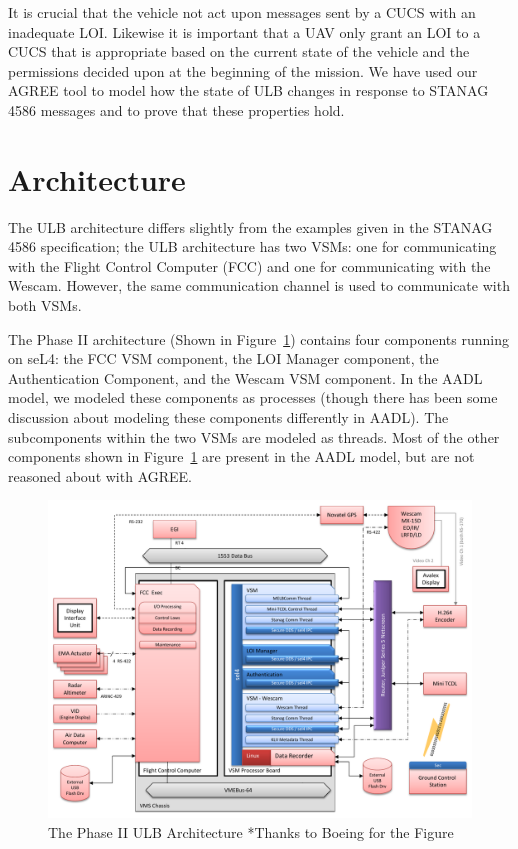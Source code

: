 \documentclass{llncs}
\begin{document}
It is crucial that the vehicle not act upon messages sent by a CUCS with an inadequate LOI.  Likewise it is important that a UAV only grant an LOI to a CUCS that is appropriate based on the current state of the vehicle and the permissions decided upon at the beginning of the mission.  We have used our AGREE tool to model how the state of ULB changes in response to STANAG 4586 messages and to prove that these properties hold.


\section{Architecture}
The ULB architecture differs slightly from the examples given in the STANAG 4586 specification; the ULB architecture has two VSMs: one for communicating with the Flight Control Computer (FCC) and one for communicating with the Wescam.  However, the same communication channel is used to communicate with both VSMs.

The Phase II architecture (Shown in Figure~\ref{fig:arch}) contains four components running on seL4: the FCC VSM component, the LOI Manager component, the Authentication Component, and the Wescam VSM component.  In the AADL model, we modeled these components as processes (though there has been some discussion about modeling these components differently in AADL).  The subcomponents within the two VSMs are modeled as threads.  Most of the other components shown in Figure~\ref{fig:arch} are present in the AADL model, but are not reasoned about with AGREE.


\begin{figure}
\begin{center}
\includegraphics[scale=0.4]{ulb-arch.pdf}
\end{center}
\caption{The Phase II ULB Architecture *Thanks to Boeing for the Figure}
\label{fig:arch}
\end{figure}
\end{document}
